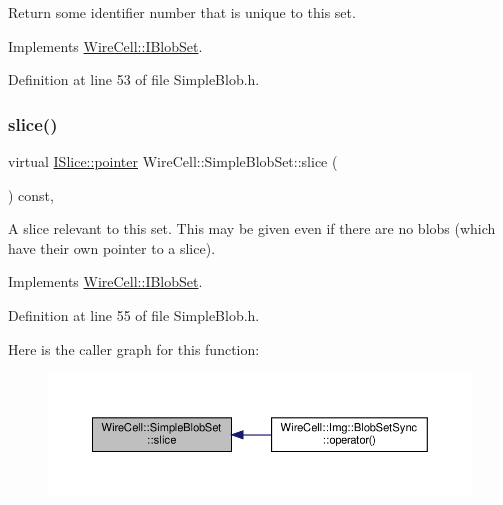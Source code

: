 Return some identifier number that is unique to this set. 



Implements \hyperlink{class_wire_cell_1_1_i_blob_set_a18567545bde587af9d775efd55bf39fa}{Wire\+Cell\+::\+I\+Blob\+Set}.



Definition at line 53 of file Simple\+Blob.\+h.

\mbox{\label{class_wire_cell_1_1_simple_blob_set_a72e71d9df512fe2efe1d3e8c5a1f7087}} 
\subsubsection{\texorpdfstring{slice()}{slice()}}
{\footnotesize\ttfamily virtual \hyperlink{class_wire_cell_1_1_i_data_aff870b3ae8333cf9265941eef62498bc}{I\+Slice\+::pointer} Wire\+Cell\+::\+Simple\+Blob\+Set\+::slice (\begin{DoxyParamCaption}{ }\end{DoxyParamCaption}) const\hspace{0.3cm}{\ttfamily [inline]}, {\ttfamily [virtual]}}

A slice relevant to this set. This may be given even if there are no blobs (which have their own pointer to a slice). 

Implements \hyperlink{class_wire_cell_1_1_i_blob_set_ac3fae97101f3ab70f6833296e43817a3}{Wire\+Cell\+::\+I\+Blob\+Set}.



Definition at line 55 of file Simple\+Blob.\+h.

Here is the caller graph for this function\+:
\nopagebreak
\begin{figure}[H]
\begin{center}
\leavevmode
\includegraphics[width=350pt]{class_wire_cell_1_1_simple_blob_set_a72e71d9df512fe2efe1d3e8c5a1f7087_icgraph}
\end{center}
\end{figure}


